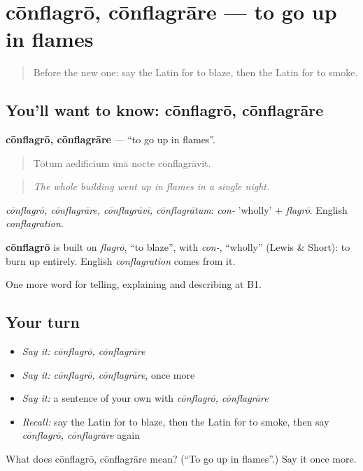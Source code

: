 \section[cōnflagrō, cōnflagrāre]{cōnflagrō, cōnflagrāre — to go up in flames}

\label{lesson:LA-C318-conflagro}



\begin{quote}
Before the new one: say the Latin for to blaze, then the Latin for to smoke.
\end{quote}

\subsection*{You'll want to know: cōnflagrō, cōnflagrāre}
\textbf{cōnflagrō, cōnflagrāre} — \textquotedblleft{}to go up in flames\textquotedblright{}.

\begin{quote}
Tōtum aedificium ūnā nocte cōnflagrāvit.
\end{quote}

\begin{quote}
\emph{The whole building went up in flames in a single night.}
\end{quote}

\emph{cōnflagrō, cōnflagrāre, cōnflagrāvī, cōnflagrātum}: \emph{con-} 'wholly' + \emph{flagrō}. English \emph{conflagration}.

\begin{cousinweb}
\textbf{cōnflagrō} is built on \emph{flagrō}, \textquotedblleft{}to blaze\textquotedblright{}, with \emph{con-}, \textquotedblleft{}wholly\textquotedblright{} (Lewis \& Short): to burn up entirely. English \emph{conflagration} comes from it.
\end{cousinweb}

\begin{grammarlens}[title={What you've built}]
One more word for telling, explaining and describing at B1.
\end{grammarlens}

\subsection*{Your turn}
\begin{itemize}
\raggedright
  \item \emph{Say it:} \emph{cōnflagrō, cōnflagrāre}
  \item \emph{Say it:} \emph{cōnflagrō, cōnflagrāre}, once more
  \item \emph{Say it:} a sentence of your own with \emph{cōnflagrō, cōnflagrāre}
  \item \emph{Recall:} say the Latin for to blaze, then the Latin for to smoke, then say \emph{cōnflagrō, cōnflagrāre} again
\end{itemize}

\begin{tcolorbox}[breakable,colback=teal!4,colframe=teal!35!black,title={Before you move on}]
What does cōnflagrō, cōnflagrāre mean? (\textquotedblleft{}To go up in flames\textquotedblright{}.) Say it once more.
\end{tcolorbox}
